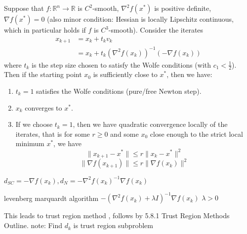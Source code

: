   \begin{theorem}
    Suppose that $f: \mathbb R^n \to \mathbb R$ is $C^2$-smooth, $\nabla^2 f(x^*)$ is positive definite, $\nabla f(x^*) = 0$ (also minor condition: Hessian is locally Lipschitz continuous, which in particular holds if $f$ is $C^3$-smooth). Consider the iterates
    \begin{align*}
        x_{k+1} &= x_k + t_k v_k \\
        &= x_k + t_k (\nabla^2 f(x_k))^{-1} (-\nabla f(x_k))
    \end{align*}
    where $t_k$ is the step size chosen to satisfy the Wolfe conditions (with $c_1 < \frac{1}{2}$). Then if the starting point $x_0$ is sufficiently close to $x^*$, then we have:
    \begin{enumerate}
        \item $t_k = 1$ satisfies the Wolfe conditions (pure/free Newton step).
        \item $x_k$ converges to $x^*$.
        \item If we choose $t_k = 1$, then we have quadratic convergence locally of the iterates, that is for some $r \geq 0$ and some $x_0$ close enough to the strict local minimum $x^*$, we have
        $$\|x_{k+1} - x^* \| \leq r \|x_k - x^*\|^2$$
        $$\| \nabla f(x_{k+1})\| \leq r \|\nabla f(x_k)\|^2$$
    \end{enumerate}
  \end{theorem}
  \begin{problem}
      $d_{SC}=-\nabla f(x_k),d_N=-\nabla^2f(x_k)^{-1}\nabla f(x_k) $
  \end{problem}
  
      levenberg marquardt algorithm
  $-(\nabla^2 f(x_k)+\lambda I)^{-1}\nabla f(x_k)$ $\lambda >0$
  \begin{problem}
      This leads to trust region method ,
      follows by 5.8.1 Trust Region Methods Outline.
      note: Find $d_k$ is trust region subproblem
  \end{problem}

